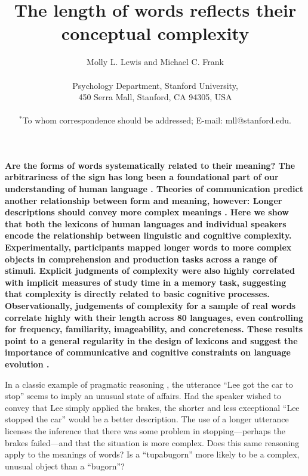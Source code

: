 \documentclass[12pt]{article}
\title{The length of words reflects their conceptual complexity}
\author
{Molly L. Lewis and Michael C. Frank\\
\\
\normalsize{Psychology Department, Stanford University,}\\
\normalsize{450 Serra Mall, Stanford, CA 94305, USA}\\
\\
\normalsize{$^\ast$To whom correspondence should be addressed; E-mail: mll@stanford.edu.}
}
\date{}
\newenvironment{sciabstract}{%
\begin{quote} \bf}
{\end{quote}}
\begin{document}
 

\baselineskip24pt

\maketitle 




{\bf Are the forms of words systematically related to their meaning? The arbitrariness of the sign has long been a foundational part of our understanding of human language \cite{saussure,hockett1960}. Theories of communication predict another relationship between form and meaning, however: Longer descriptions should convey more complex meanings \cite{horn1984,jaeger2006}. Here we show that both the lexicons of human languages and individual speakers encode the relationship between linguistic and cognitive complexity. Experimentally, participants mapped longer words to more complex objects in comprehension and production tasks  across a range of stimuli. Explicit judgments of complexity were also highly correlated with implicit measures of study time in a memory task, suggesting that complexity is directly related to basic cognitive processes. Observationally, judgements of complexity for a sample of real words correlate highly with their length across 80 languages, even controlling for frequency, familiarity, imageability, and concreteness. These results point to a general regularity in the design of lexicons and suggest the importance of communicative and cognitive constraints on language evolution \cite{christiansen2008,lieberman2007}.}


In a classic example of pragmatic reasoning \cite{horn1984}, the utterance ``Lee got the car to stop'' seems to imply an unusual state of affairs. Had the speaker wished to convey that Lee simply applied the brakes, the shorter and less exceptional ``Lee stopped the car'' would be a better description. The use of a longer utterance licenses the inference that there was some problem in stopping---perhaps the brakes failed---and that the situation is more complex. Does this same reasoning apply to the meanings of words? Is a ``tupabugorn'' more likely to be a complex, unusual object than a ``bugorn''? 
\end{document}
